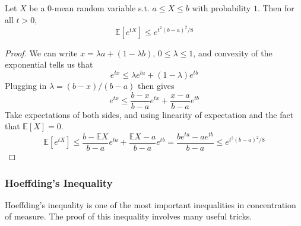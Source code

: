 \documentclass{article}
\begin{document}
      \begin{lemma}
      Let $X$ be a $0$-mean random variable s.t. $a \leq X \leq b$ with probability $1$. Then for all $t > 0$, 
      \begin{equation}
        \mathbb{E}[ e^{t X}] \leq e^{t^2 (b - a)^2 / 8}
      \end{equation}
      \end{lemma}
      \begin{proof}
        We can write $x = \lambda a + (1 - \lambda b)$, $0 \leq \lambda \leq 1$, and convexity of the exponential tells us that 
        \begin{equation}
          e^{tx} \leq \lambda e^{ta} + (1 - \lambda) e^{tb}
        \end{equation}
        Plugging in $\lambda = (b - x) / (b - a)$ then gives 
        \begin{equation}
          e^{tx} \leq \frac{b - x}{b - a} e^{tx} + \frac{x - a}{b - a} e^{tb}
        \end{equation}
        Take expectations of both sides, and using linearity of expectation and the fact that $\mathbb{E}[X] = 0$. 
        \begin{equation}
          \mathbb{E}[e^{tX}] \leq \frac{b - \mathbb{E} X}{b - a} e^{ta} + \frac{\mathbb{E} X - a}{b - a} e^{tb} = \frac{b e^{ta} - a e^{tb}}{b - a} \leq e^{t^2 (b - a)^2 / 8}
        \end{equation}
      \end{proof}

    \subsubsection{Hoeffding's Inequality}

      Hoeffding's inequality is one of the most important inequalities in concentration of measure. The proof of this inequality involves many useful tricks. 
\end{document}
